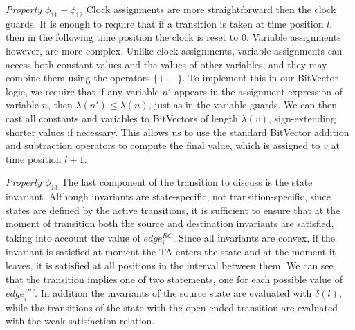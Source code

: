\documentclass[a4paper,12pt]{article}
\begin{document}
\emph{Property $\phi_{11} - \phi_{12}$} Clock assignments are more
straightforward then the clock guards. It is enough to require that if a
transition is taken at time position \(l\), then in the following time position
the clock is reset to 0. Variable assignments however, are more complex. Unlike
clock assignments, variable assignments can access both constant values and the
values of other variables, and they may combine them using the operators
\(\{+,-\}\). To implement this in our BitVector logic, we require that if any
variable \(n'\) appears in the assignment expression of variable \(n\), then
$\lambda(n') \leq \lambda(n)$, just as in the variable guards. We can then cast
all constants and variables to BitVectors of length \(\lambda(v)\),
sign-extending shorter values if necessary. This allows us to use the standard
BitVector addition and subtraction operators to compute the final value, which
is assigned to \(v\) at time position \(l{+}1\).

\emph{Property $\phi_{13}$} The last component of the transition to discuss is
the state invariant. Although invariants are state-specific, not
transition-specific, since states are defined by the active transitions, it is
sufficient to ensure that at the moment of transition both the source and
destination invariants are satisfied, taking into account the value of
$\overleftarrow{edge_{i}^{RC}}$. Since all invariants are convex, if the
invariant is satisfied at moment the TA enters the state and at the moment it
leaves, it is satisfied at all positions in the interval between them. We can
see that the transition implies one of two statements, one for each possible
value of $\overleftarrow{edge_{i}^{RC}}$. In addition the invariants of the
source state are evaluated with $\delta(l)$, while the transitions of the state
with the open-ended transition are evaluated with the weak satisfaction
relation.



\end{document}

